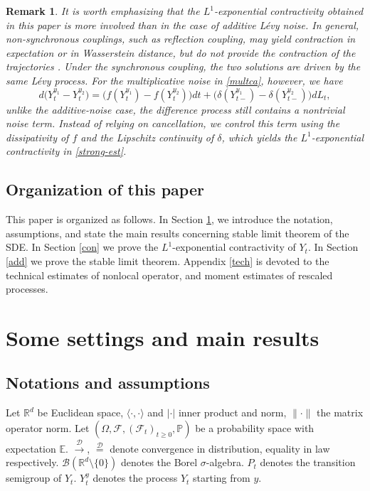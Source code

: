 \documentclass[11pt,reqno]{amsart}
\newtheorem{remark}{\indent Remark}[section]
\numberwithin{equation}{section}
\begin{document}
\begin{remark}
	It is worth emphasizing that the $L^1$-exponential contractivity	obtained in this paper is more involved than in the case of additive Lévy noise. In general, non-synchronous couplings, such as reflection coupling, may yield contraction in expectation or in Wasserstein distance, but do not	provide the contraction of the trajectories \cite{JW2}.
	Under the synchronous coupling, the two solutions are driven by the
	same Lévy process. For the multiplicative noise in \eqref{multca},
	however, we have
	\[
	d\big(Y_t^{y_1}-Y_t^{y_2}\big)=\big(f(Y_t^{y_1})-f(Y_t^{y_2})\big)dt+
	\big(\delta(Y_{t-}^{y_1})-\delta(Y_{t-}^{y_2})\big)dL_t,
	\]
unlike the additive-noise case, the difference process still contains a nontrivial noise term. Instead of relying on cancellation, we control this term using the dissipativity of $f$ and the Lipschitz continuity of $\delta$, which yields the $L^1$-exponential contractivity in \eqref{strong-est}.
\end{remark}





\subsection{Organization of this paper}
This paper is organized as follows. In Section \ref{setting}, we introduce the notation, assumptions, and state the main results concerning stable limit theorem of the SDE. In Section \ref{con} we prove the $L^1$-exponential contractivity of $Y_t$. In Section \ref{add} we prove the stable limit theorem. Appendix \ref{tech} is devoted to the technical estimates of nonlocal operator, and moment estimates of rescaled processes. 






\section{Some settings and main results}\label{setting}

\subsection{Notations and assumptions}
Let $\mathbb R^d$ be Euclidean space, $\langle\cdot,\cdot\rangle$ and $|\cdot|$ inner product and norm, $\|\cdot\|$ the matrix  operator norm.  Let $(\Omega,\mathcal F,(\mathcal F_t)_{t\ge0},\mathbb P)$ be a probability space with expectation $\mathbb E$.  $\xrightarrow{\mathcal D}$, $\overset{\mathcal D}{=}$ denote convergence in distribution, equality in law respectively. $\mathcal{B}(\mathbb{R}^d\setminus\{0\})$ denotes the Borel $\sigma$-algebra. $P_t$ denotes the transition semigroup of $Y_t$.  $Y^{y}_{t}$  denotes the process $Y_{t}$ starting from $y$. 
\end{document}
